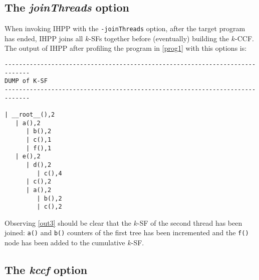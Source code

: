 \documentclass[a4paper,10pt]{report}
\begin{document}
\subsection{The \emph{joinThreads} option}

When invoking IHPP with the \verb|-joinThreads| option,
after the target program has ended,
IHPP joins all $k$-SFs together before (eventually) building the $k$-CCF.
The output of IHPP after profiling the program in \cref{prog1} with this options is:

\begin{lstlisting}[label=out3, frame=bottomline,
caption={the output of IHPP with the joinThreads option}]
-----------------------------------------------------------------------------
DUMP of K-SF
-----------------------------------------------------------------------------

| __root__(),2
   | a(),2
      | b(),2
      | c(),1
      | f(),1
   | e(),2
      | d(),2
         | c(),4
      | c(),2
      | a(),2
         | b(),2
         | c(),2
\end{lstlisting}
\noindent
Observing \cref{out3} should be clear that the $k$-SF of the second thread has been joined:
\verb|a()| and \verb|b()| counters of the first tree has been incremented and the \verb|f()| node has been added to the cumulative $k$-SF.

\subsection{The \emph{kccf} option}
\end{document}
